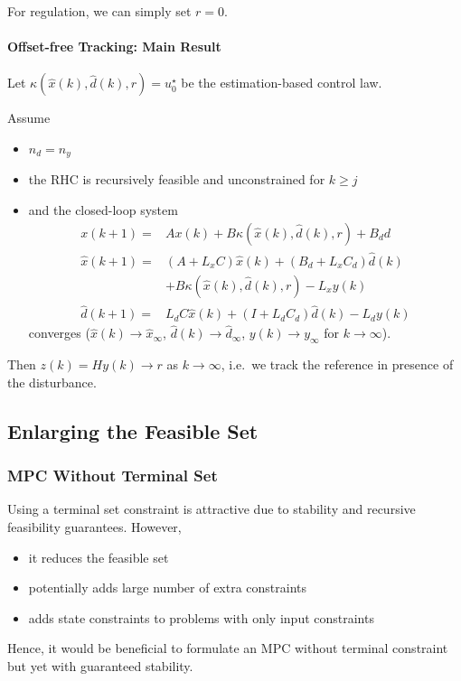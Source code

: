 For regulation, we can simply set $r=0$.

\paragraph{Offset-free Tracking: Main Result}

Let $\kappa(\hat{x}(k), \hat{d}(k), r) = u_0^\star$ be the estimation-based control law.

Assume
\begin{itemize}
    \item $n_d = n_y$
    \item the RHC is recursively feasible and unconstrained for $k \geq j$
    \item and the closed-loop system
          \begin{align*}
              x(k+1)        = & Ax(k) + B \kappa(\hat{x}(k), \hat{d}(k), r) + B_d d    \\
              \hat{x}(k+1)  = & (A + L_x C) \hat{x}(k) + (B_d + L_x C_d) \hat{d}(k)    \\
                              & + B \kappa(\hat{x}(k), \hat{d}(k), r) - L_x y(k)       \\
              \hat{d}(k+1)  = & L_d C \hat{x}(k) + (I + L_d C_d) \hat{d}(k) - L_d y(k)
          \end{align*}
          converges ($\hat{x}(k)\rightarrow \hat{x}_{\infty}$, $\hat{d}(k)\rightarrow \hat{d}_{\infty}$, $y(k)\rightarrow y_{\infty}$ for $k\rightarrow \infty$).
\end{itemize}
Then $z(k) = Hy(k) \to r$ as $k \to \infty$, i.e.\ we track the reference in presence of the disturbance.

\subsection{Enlarging the Feasible Set}
\subsubsection{MPC Without Terminal Set}
Using a terminal set constraint is attractive due to stability and recursive feasibility guarantees. However,
\begin{itemize}
    \item it reduces the feasible set
    \item potentially adds large number of extra constraints
    \item adds state constraints to problems with only input constraints
\end{itemize}
Hence, it would be beneficial to formulate an MPC without terminal constraint but yet with guaranteed stability.
\newpar{}

